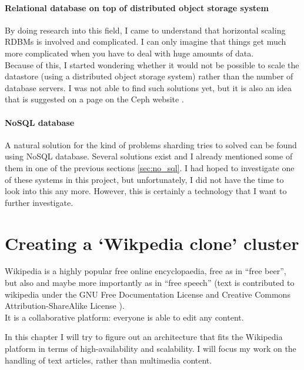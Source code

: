 \documentclass[12pt]{report}
\begin{document}
\subsubsection{Relational database on top of distributed object
  storage system} 
By doing research into this field, I came to understand that
horizontal scaling RDBMs is involved and complicated. I can only
imagine that things get much more complicated when you have to deal
with huge amounts of data.\\
Because of this, I started wondering whether it would not be possible
to scale the datastore (using a distributed object storage system)
rather than the number of database servers. 
I was not able to find such solutions yet, but it is also an idea that
is suggested on a page on the Ceph website
\cite{ceph_more_than_an_object_store}.

\subsubsection{NoSQL database}
A natural solution for the kind of problems sharding tries to solved
can be found using NoSQL database. Several solutions exist and I
already mentioned some of them in one of the previous sections
\ref{sec:no_sql}.
I had hoped to investigate one of these systems in this project, but
unfortunately, I did not have the time to look into this any
more. However, this is certainly a technology that I want to further
investigate. 

\chapter{Creating a `Wikpedia clone' cluster}
Wikipedia is a highly popular free online encyclopaedia, free 
as in ``free beer'', but also and maybe more importantly as in ``free
speech'' (text is contributed to wikipedia under the GNU Free
Documentation License \cite{gnu_free_doc_license} and Creative Commons
Attribution-ShareAlike License \cite{cca_license}).\\ It is a
collaborative platform: everyone is able to edit any content.

In this chapter I will try to figure out an architecture that fits the
Wikipedia platform in terms of high-availability and scalability.
I will focus my work on the handling of text articles, rather than
multimedia content.
\end{document}
